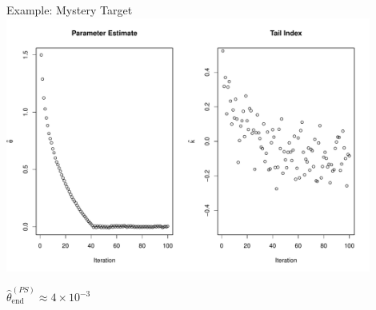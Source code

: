 \documentclass[14pt]{beamer}
\begin{document}
\begin{frame}{Example: Mystery Target}
    \centering
    \includegraphics[height=0.7\textheight, width=0.9\textwidth, keepaspectratio]{Figures/PS traj.pdf} \newline
    \begin{outline}
        $\hat{\theta}_\mathrm{end}^{(PS)} \approx 4 \times 10^{-3}$ \hspace{5cm}
    \end{outline}
\end{frame}
\end{document}

